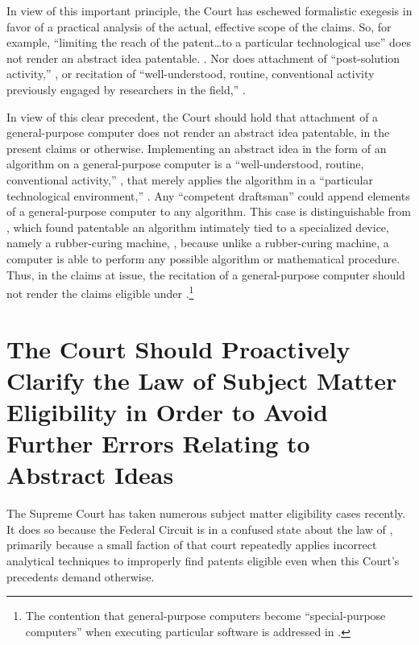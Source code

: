 \documentclass{scotus}
\begin{document}
In view of this important principle, the Court has eschewed
formalistic exegesis in favor of a practical analysis of the actual, effective
scope of the claims.
So, for example,
``limiting the reach of the patent\ldots to a
particular technological use'' does not render an abstract idea patentable.
. Nor does attachment of
``post-solution activity,''
,
or
recitation of ``well-understood, routine, conventional activity previously
engaged by researchers in the field,''
.

In view of this clear precedent, the Court should hold that
attachment of a general-purpose computer does not render an abstract idea
patentable, in the present claims or otherwise.
Implementing an
abstract idea in the form of an algorithm on a general-purpose computer is a
``well-understood, routine, conventional activity,'' , that
merely
applies the algorithm in a ``particular technological environment,''
.
Any ``competent draftsman'' could append elements of a
general-purpose computer to any algorithm.
This case is distinguishable from , which found patentable an
algorithm intimately tied to a specialized device, namely a rubber-curing
machine, , because unlike a rubber-curing machine, a
computer is able to perform any possible algorithm or mathematical
procedure.
Thus, in the claims at issue, the recitation of a general-purpose computer
should not render the claims eligible under .\footnote{The
contention that general-purpose computers become ``special-purpose computers''
when executing particular software is addressed in .}



%
%
\section{The Court Should Proactively Clarify the Law of Subject Matter
Eligibility in Order to Avoid Further Errors Relating to Abstract Ideas}

The Supreme Court has taken numerous subject matter eligibility cases recently.
It does so because the Federal Circuit is in a confused state about the law of
, primarily because a small faction of that court repeatedly applies
incorrect analytical techniques to improperly find patents eligible even when
this Court's precedents demand otherwise.
\end{document}
